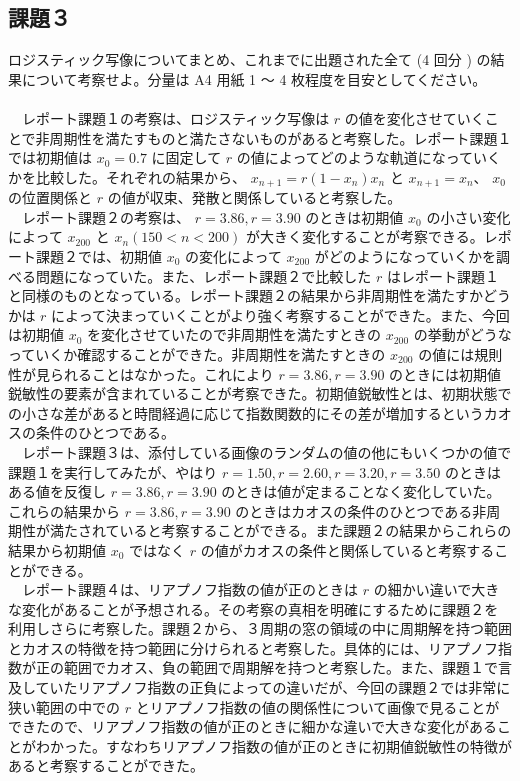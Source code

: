 \subsection{課題３}
ロジスティック写像についてまとめ、これまでに出題された全て (4 回分 ) の結果について考察せよ。分量は A4 用紙 1 〜 4 枚程度を目安としてください。\\\\
　レポート課題１の考察は、ロジスティック写像は $r$ の値を変化させていくことで非周期性を満たすものと満たさないものがあると考察した。レポート課題１では初期値は $x_0 = 0.7$ に固定して $r$ の値によってどのような軌道になっていくかを比較した。それぞれの結果から、 $x_{n+1} = r(1 −x_n)x_n$ と $x_{n+1} = x_n$、 $x_0$ の位置関係と $r$ の値が収束、発散と関係していると考察した。\\
　レポート課題２の考察は、 $r = 3.86, r = 3.90$ のときは初期値 $x_0$ の小さい変化によって $x_{200}$ と $x_n (150 < n < 200)$ が大きく変化することが考察できる。レポート課題２では、初期値 $x_0$ の変化によって $x_{200}$ がどのようになっていくかを調べる問題になっていた。また、レポート課題２で比較した $r$ はレポート課題１と同様のものとなっている。レポート課題２の結果から非周期性を満たすかどうかは $r$ によって決まっていくことがより強く考察することができた。また、今回は初期値 $x_0$ を変化させていたので非周期性を満たすときの $x_{200}$ の挙動がどうなっていくか確認することができた。非周期性を満たすときの $x_{200}$ の値には規則性が見られることはなかった。これにより $r = 3.86, r = 3.90$ のときには初期値鋭敏性の要素が含まれていることが考察できた。初期値鋭敏性とは、初期状態での小さな差があると時間経過に応じて指数関数的にその差が増加するというカオスの条件のひとつである。\\
　レポート課題３は、添付している画像のランダムの値の他にもいくつかの値で課題１を実行してみたが、やはり $r = 1.50, r = 2.60, r = 3.20, r = 3.50$ のときはある値を反復し $r = 3.86, r = 3.90$ のときは値が定まることなく変化していた。これらの結果から $r = 3.86, r = 3.90$ のときはカオスの条件のひとつである非周期性が満たされていると考察することができる。また課題２の結果からこれらの結果から初期値 $x_0$ ではなく $r$ の値がカオスの条件と関係していると考察することができる。\\
　レポート課題４は、リアプノフ指数の値が正のときは $r$ の細かい違いで大きな変化があることが予想される。その考察の真相を明確にするために課題２を利用しさらに考察した。課題２から、３周期の窓の領域の中に周期解を持つ範囲とカオスの特徴を持つ範囲に分けられると考察した。具体的には、リアプノフ指数が正の範囲でカオス、負の範囲で周期解を持つと考察した。また、課題１で言及していたリアプノフ指数の正負によっての違いだが、今回の課題２では非常に狭い範囲の中での $r$ とリアプノフ指数の値の関係性について画像で見ることができたので、リアプノフ指数の値が正のときに細かな違いで大きな変化があることがわかった。すなわちリアプノフ指数の値が正のときに初期値鋭敏性の特徴があると考察することができた。\\
